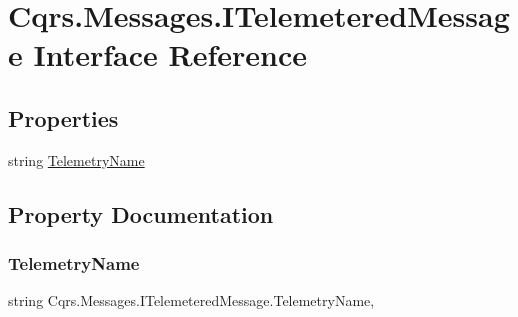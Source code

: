 \hypertarget{interfaceCqrs_1_1Messages_1_1ITelemeteredMessage}{}\section{Cqrs.\+Messages.\+I\+Telemetered\+Message Interface Reference}
\label{interfaceCqrs_1_1Messages_1_1ITelemeteredMessage}
\subsection*{Properties}
\begin{DoxyCompactItemize}
\item 
string \hyperlink{interfaceCqrs_1_1Messages_1_1ITelemeteredMessage_af8106e5bc763e16284567c334b733733}{Telemetry\+Name}
\end{DoxyCompactItemize}


\subsection{Property Documentation}
\mbox{\label{interfaceCqrs_1_1Messages_1_1ITelemeteredMessage_af8106e5bc763e16284567c334b733733}} 
\subsubsection{\texorpdfstring{Telemetry\+Name}{TelemetryName}}
{\footnotesize\ttfamily string Cqrs.\+Messages.\+I\+Telemetered\+Message.\+Telemetry\+Name\hspace{0.3cm}{\ttfamily [get]}, {\ttfamily [set]}}

